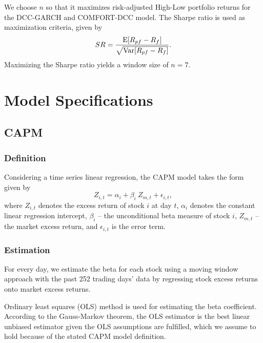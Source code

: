 \documentclass[11pt,a4paper]{article}
\begin{document}
We choose $n$ so that it maximizes risk-adjusted High-Low portfolio returns for the DCC-GARCH and COMFORT-DCC model. The Sharpe ratio is used as maximization criteria, given by
\begin{equation}
	SR = \dfrac{\textrm{E}[R_{pf} - R_f]}{\sqrt{\textrm{Var}[R_{pf} - R_f]}}.
\end{equation}
Maximizing the Sharpe ratio yields a window size of $n=7$.





\newpage
\section{Model Specifications}


\subsection{CAPM}

\subsubsection{Definition}

Considering a time series linear regression, the CAPM model takes the form given by
\begin{equation}
Z_{i,t} = \alpha_i + \beta_i\ Z_{m,t} + \epsilon_{i,t},
\end{equation}
where $Z_{i,t}$ denotes the excess return of stock $i$ at day $t$, $\alpha_i$ denotes the constant linear regression intercept, $\beta_i$ -- the unconditional beta measure of stock $i$, $Z_{m,t}$ -- the market excess return, and $\epsilon_{i,t}$ is the error term.


\subsubsection{Estimation}

For every day, we estimate the beta for each stock using a moving window approach with the past 252 trading days' data by regressing stock excess returns onto market excess returns.

Ordinary least squares (OLS) method is used for estimating the beta coefficient. According to the Gauss-Markov theorem, the OLS estimator is the best linear unbiased estimator given the OLS assumptions are fulfilled, which we assume to hold because of the stated CAPM model definition.
\end{document}
